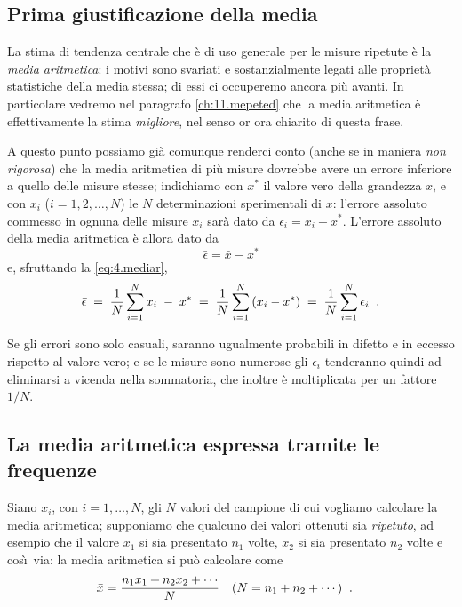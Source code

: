 \subsection{Prima giustificazione della media}%
 La
stima di tendenza centrale che \`e di uso generale per le
misure ripetute \`e la \emph{media aritmetica}: i motivi
sono svariati e sostanzialmente legati alle propriet\`a
statistiche della media stessa; di essi ci occuperemo ancora
pi\`u avanti.  In particolare vedremo nel paragrafo
\ref{ch:11.mepeted} che la media aritmetica \`e
effettivamente la stima \emph{migliore}, nel senso or ora
chiarito di questa frase.

A questo punto possiamo gi\`a comunque renderci conto (anche
se in maniera \emph{non rigorosa}) che la media aritmetica
di pi\`u misure dovrebbe avere un errore inferiore a quello
delle misure stesse; indichiamo con $x^*$ il valore vero
della grandezza $x$, e con $x_i$ ($i = 1, 2, \ldots, N$) le
$N$ determinazioni sperimentali di $x$: l'errore assoluto
commesso in ognuna delle misure $x_i$ sar\`a dato da
$\epsilon_i = x_i - x^*$.  L'errore assoluto della media
aritmetica \`e allora dato da
\begin{equation*}
  \bar \epsilon = \bar x - x^*
\end{equation*}
e, sfruttando la \eqref{eq:4.mediar},
\begin{equation*}
  \bar \epsilon \; = \; \frac{1}{N}\sum_{i=1}^N x_i \; - \;
  x^* \; = \; \frac{1}{N}\sum_{i=1}^N \left( x_i-x^* \right)
  \; = \; \frac{1}{N}\sum_{i=1}^N \epsilon_i \;\; .
\end{equation*}

Se gli errori sono solo casuali, saranno ugualmente
probabili in difetto e in eccesso rispetto al valore vero; e
se le misure sono numerose gli $\epsilon_{i}$ tenderanno
quindi ad eliminarsi a vicenda nella sommatoria, che inoltre
\`e moltiplicata per un fattore
$1/N$.%

\subsection{La media aritmetica espressa tramite le
  frequenze}
\label{ch:4.medpes}
Siano $x_i$, con $i = 1, \ldots, N$, gli $N$ valori del
campione di cui vogliamo calcolare la media aritmetica;
supponiamo che qualcuno dei valori ottenuti sia
\emph{ripetuto}, ad esempio che il valore $x_1$ si sia
presentato $n_1$ volte, $x_2$ si sia presentato $n_2$ volte
e cos\`\i\ via: la media aritmetica si pu\`o calcolare
come
\begin{align*}
  \bar x &= \frac{n_1 x_1 + n_2 x_2 +\cdots}{N}
  & (N &= n_1 + n_2 +\cdots) \;\; .
\end{align*}

